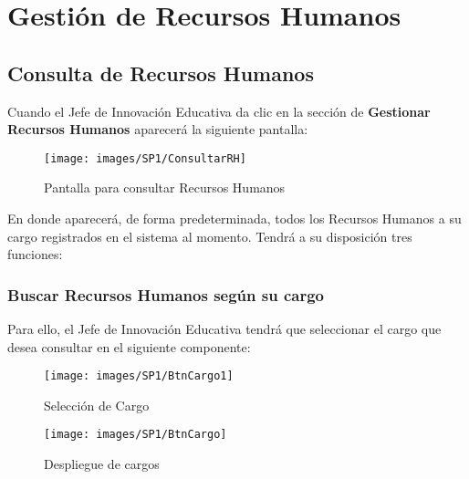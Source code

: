 
\chapter{Gestión de Recursos Humanos}
    \section{Consulta de Recursos Humanos}
        Cuando el Jefe de Innovación Educativa da clic en la sección de \textbf{Gestionar Recursos Humanos} aparecerá la siguiente pantalla:


        \begin{figure}[!hbtp]
        	\centering
        	\hypertarget{consultarrh}{\texttt{[image: images/SP1/ConsultarRH]}}
        	\caption{Pantalla para consultar Recursos Humanos}
        	\label{consultarrh}
        \end{figure}

        En donde aparecerá, de forma predeterminada, todos los Recursos Humanos a su cargo registrados en el sistema al momento. Tendrá a su disposición tres funciones:

    	\subsection{Buscar Recursos Humanos según su cargo}

        	Para ello, el Jefe de Innovación Educativa tendrá que seleccionar el cargo que desea consultar en el siguiente componente:

        	\begin{figure}[!hbtp]
        		\centering
        		\hypertarget{cargo1}{\texttt{[image: images/SP1/BtnCargo1]}}
        		\caption{Selección de Cargo}
        		\label{cargo1}
        	\end{figure}

        	\begin{figure}[!hbtp]
        		\centering
        		\hypertarget{cargo}{\texttt{[image: images/SP1/BtnCargo]}}
        		\caption{Despliegue de cargos}
        		\label{cargo}
        	\end{figure}

